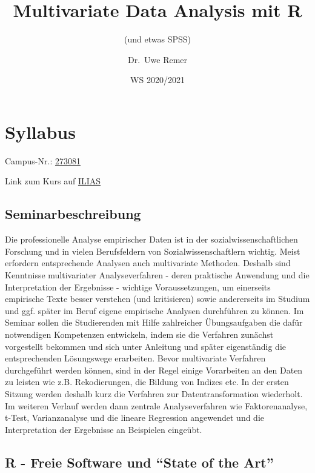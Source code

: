 \documentclass[
]{article}
\title{Multivariate Data Analysis mit R}
\subtitle{(und etwas SPSS)}
\author{Dr.~Uwe Remer}
\date{WS 2020/2021}
\begin{document}
\maketitle

{
\setcounter{tocdepth}{2}
\tableofcontents
}
\hypertarget{syllabus}{%
\section{Syllabus}\label{syllabus}}

Campus-Nr.:
\href{https://campus.uni-stuttgart.de/cusonline/pl/ui/$ctx/wbLv.wbShowLVDetail?pStpSpNr=273081}{273081}

Link zum Kurs auf
\href{https://ilias3.uni-stuttgart.de/goto_Uni_Stuttgart_crs_2095425.html}{ILIAS}

\hypertarget{seminarbeschreibung}{%
\subsection{Seminarbeschreibung}\label{seminarbeschreibung}}

Die professionelle Analyse empirischer Daten ist in der
sozialwissenschaftlichen Forschung und in vielen Berufsfeldern von
Sozialwissenschaftlern wichtig. Meist erfordern entsprechende Analysen
auch multivariate Methoden. Deshalb sind Kenntnisse multivariater
Analyseverfahren - deren praktische Anwendung und die Interpretation der
Ergebnisse - wichtige Voraussetzungen, um einerseits empirische Texte
besser verstehen (und kritisieren) sowie andererseits im Studium und
ggf. später im Beruf eigene empirische Analysen durchführen zu können.
Im Seminar sollen die Studierenden mit Hilfe zahlreicher Übungsaufgaben
die dafür notwendigen Kompetenzen entwickeln, indem sie die Verfahren
zunächst vorgestellt bekommen und sich unter Anleitung und später
eigenständig die entsprechenden Lösungswege erarbeiten. Bevor
multivariate Verfahren durchgeführt werden können, sind in der Regel
einige Vorarbeiten an den Daten zu leisten wie z.B. Rekodierungen, die
Bildung von Indizes etc. In der ersten Sitzung werden deshalb kurz die
Verfahren zur Datentransformation wiederholt. Im weiteren Verlauf werden
dann zentrale Analyseverfahren wie Faktorenanalyse, t-Test,
Varianzanalyse und die lineare Regression angewendet und die
Interpretation der Ergebnisse an Beispielen eingeübt.

\hypertarget{r---freie-software-und-state-of-the-art}{%
\subsection{R - Freie Software und ``State of the
Art''}\label{r---freie-software-und-state-of-the-art}}
\end{document}
